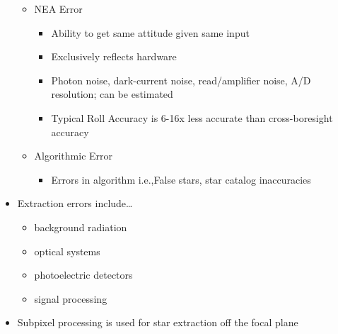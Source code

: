 \begin{itemize}
\begin{itemize}
\begin{itemize}
        \end{itemize} 
    \end{itemize}
    \begin{itemize}
        \item NEA Error 
        \begin{itemize}
            \item Ability to get same attitude given same input
            \item Exclusively reflects hardware
            \item Photon noise, dark-current noise, read/amplifier noise, A/D resolution; can be estimated
            \item Typical Roll Accuracy is 6-16x less accurate than cross-boresight accuracy
        \end{itemize}
    \end{itemize}
    \begin{itemize}
        \item Algorithmic Error
        \begin{itemize}
            \item Errors in algorithm i.e.,False stars, star catalog inaccuracies
        \end{itemize}
    \end{itemize}
    \item Extraction errors include\dots
    \begin{itemize}
        \item background radiation
        \item optical systems
        \item photoelectric detectors
        \item signal processing
    \end{itemize}
    \item Subpixel processing is used for star extraction off the focal plane
\end{itemize}
